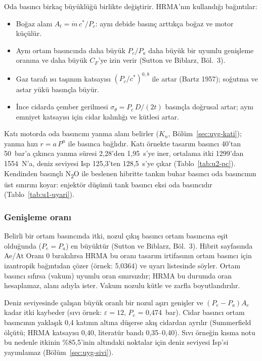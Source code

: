 \documentclass[11pt,a4paper]{article}
\newcommand{\ui}[1]{\textsf{#1}}
\begin{document}
Oda basıncı birkaç büyüklüğü birlikte değiştirir. HRMA'nın kullandığı
bağıntılar:

\begin{itemize}[leftmargin=1.4em]
  \item Boğaz alanı $A_t = \dot m\,c^*/P_c$: aynı debide basınç arttıkça boğaz
  ve motor küçülür.
  \item Aynı ortam basıncında daha büyük $P_c/P_a$ daha büyük bir uyumlu
  genişleme oranına ve daha büyük $C_F$'ye izin verir (Sutton ve Biblarz,
  Böl.~3).
  \item Gaz tarafı ısı taşınım katsayısı $(P_c/c^*)^{0{,}8}$ ile artar
  (Bartz 1957); soğutma ve astar yükü basınçla büyür.
  \item İnce cidarda çember gerilmesi $\sigma_\theta = P_c\,D/(2t)$ basınçla
  doğrusal artar; aynı emniyet katsayısı için cidar kalınlığı ve kütlesi artar.
\end{itemize}

Katı motorda oda basıncını yanma alanı belirler ($K_n$,
Bölüm~\ref{sec:uyg-kati}); yanma hızı $r = a\,P^n$ ile basınca bağlıdır. Katı
örnekte tasarım basıncı 40'tan 50~bar'a çıkınca yanma süresi 2,28'den 1,95~s'ye
iner, ortalama itki 1299'dan 1554~N'a, deniz seviyesi Isp 125,3'ten 128,5~s'ye
çıkar (Tablo~\ref{tab:u2-pc}). Kendinden basınçlı N\textsubscript{2}O ile
beslenen hibritte tankın buhar basıncı oda basıncının üst sınırını koyar:
enjektör düşümü tank basıncı eksi oda basıncıdır (Tablo~\ref{tab:u1-uyari}).

\subsubsection{Genişleme oranı}

Belirli bir ortam basıncında itki, nozul çıkış basıncı ortam basıncına eşit
olduğunda ($P_e = P_a$) en büyüktür (Sutton ve Biblarz, Böl.~3). Hibrit
sayfasında \ui{Ae/At Oranı} 0 bırakılırsa HRMA bu oranı tasarım irtifasının
ortam basıncı için izantropik bağıntıdan çözer (örnek: 5,0364) ve uyarı
listesinde söyler. Ortam basıncı sıfırsa (vakum) uyumlu oran sınırsızdır; HRMA
bu durumda oran hesaplamaz, alanı adıyla ister. Vakum nozulu kütle ve zarfla
boyutlandırılır.

Deniz seviyesinde çalışan büyük oranlı bir nozul aşırı genişler ve
$(P_e - P_a)A_e$ kadar itki kaybeder (sıvı örnek: $\varepsilon = 12$, $P_e$ =
0,474~bar). Cidar basıncı ortam basıncının yaklaşık 0,4 katının altına düşerse
akış cidardan ayrılır (Summerfield ölçütü; HRMA katsayısı 0,40, literatür
bandı 0,35--0,40). Sıvı örneğin kısma notu bu nedenle itkinin \%85,5'inin
altındaki noktalar için deniz seviyesi Isp'si yayımlamaz
(Bölüm~\ref{sec:uyg-sivi}).
\end{document}
